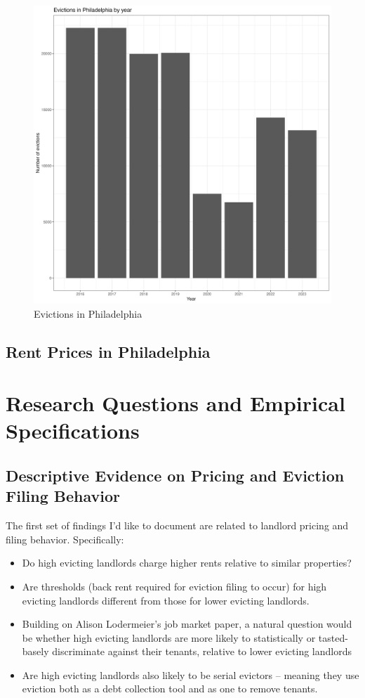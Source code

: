 \documentclass{article}
\begin{document}
\begin{figure}[htbp]
    \centering
    \includegraphics[width=0.6\linewidth]{figs/evict_by_year.png}
    \caption{Evictions in Philadelphia}
    \label{fig:philly-year}
\end{figure}



\subsection{Rent Prices in Philadelphia}

\section{Research Questions and Empirical Specifications}

\subsection{Descriptive Evidence on Pricing and Eviction Filing Behavior}

The first set of findings I'd like to document are related to landlord pricing and filing behavior. Specifically:

\begin{itemize}
    \item Do high evicting landlords charge higher rents relative to similar properties?
    \item Are thresholds (back rent required for eviction filing to occur) for high evicting landlords different from those for lower evicting landlords. 
    \item Building on Alison Lodermeier's job market paper, a natural question would be whether high evicting landlords are more likely to statistically or tasted-basely discriminate against their tenants, relative to lower evicting landlords 
    \item Are high evicting landlords also likely to be serial evictors -- meaning they use eviction both as a debt collection tool and as one to remove tenants.
\end{itemize} \\
\end{document}
